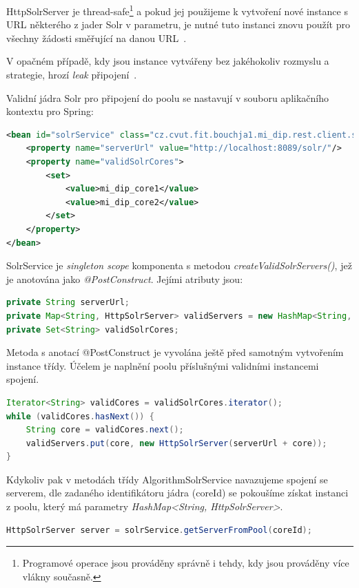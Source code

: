 \documentclass[thesis=M,czech]{FITthesis}[2014/05/07]
\begin{document}
HttpSolrServer je thread-safe\footnote{Programové operace jsou prováděny správně i tehdy, kdy jsou prováděny více vlákny současně.} a pokud jej použijeme k vytvoření nové instance s URL některého z jader Solr v parametru, je nutné tuto instanci znovu použít pro všechny žádosti směřující na danou URL~\cite{solrj}. 

V opačném případě, kdy jsou instance vytvářeny bez jakéhokoliv rozmyslu a strategie, hrozí \emph{leak} připojení~\cite{metawerx}.

Validní jádra Solr pro připojení do poolu se nastavují v souboru aplikačního kontextu pro Spring:

\begin{lstlisting}[language=xml]
<bean id="solrService" class="cz.cvut.fit.bouchja1.mi_dip.rest.client.solr.SolrService">
    <property name="serverUrl" value="http://localhost:8089/solr/"/>
    <property name="validSolrCores">
        <set>
            <value>mi_dip_core1</value>
            <value>mi_dip_core2</value>
        </set>
    </property>        
</bean>  
\end{lstlisting}

SolrService je \emph{singleton scope} komponenta s metodou \emph{createValidSolrServers()}, jež je anotována jako \emph{@PostConstruct}. Jejími atributy jsou:

\begin{lstlisting}[language=java]
private String serverUrl;
private Map<String, HttpSolrServer> validServers = new HashMap<String, HttpSolrServer>();
private Set<String> validSolrCores;
\end{lstlisting}

Metoda s anotací @PostConstruct je vyvolána ještě před samotným vytvořením instance třídy. Účelem je naplnění poolu příslušnými validními instancemi spojení.

\begin{lstlisting}[language=java]
Iterator<String> validCores = validSolrCores.iterator();
while (validCores.hasNext()) {
    String core = validCores.next();
    validServers.put(core, new HttpSolrServer(serverUrl + core));
}
\end{lstlisting}

Kdykoliv pak v metodách třídy AlgorithmSolrService navazujeme spojení se serverem, dle zadaného identifikátoru jádra (coreId) se pokoušíme získat instanci z poolu, který má parametry \emph{HashMap<String, HttpSolrServer>}. 

\begin{lstlisting}[language=java]
HttpSolrServer server = solrService.getServerFromPool(coreId);
\end{lstlisting}
\end{document}
